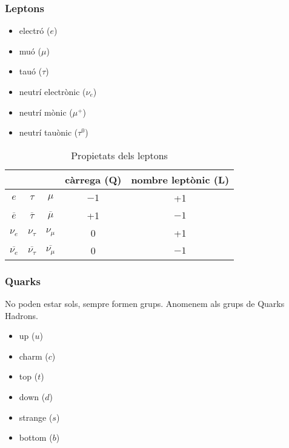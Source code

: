 \subsubsection{Leptons}
\label{ssub:leptons}

\begin{itemize}
    \item electró ($e$)
    \item muó ($\mu$)
    \item tauó ($\tau$)
    \item neutrí electrònic ($\nu_e$)
    \item neutrí mònic ($\mu^+$)
    \item neutrí tauònic ($\tau^0$)
\end{itemize}

\begin{table}[H]
    \centering
    \caption{Propietats dels leptons}
    \label{tab:propietats_dels_leptons}
    \begin{tabular}{ccccc}
        \toprule
        & & & càrrega (Q) & nombre leptònic (L) \\
        \midrule
        $e$ & $\tau$ & $\mu$ & $-1$ & +1 \\
        $\overline{e}$ & $\overline{\tau}$ & $\overline{\mu}$ & +1 & $-1$ \\
        $\nu_e$ & $\nu_\tau$ & $\nu_\mu$ & 0 & +1 \\
        $\overline{\nu_e}$ & $\overline{\nu_\tau}$ & $\overline{\nu_\mu}$ & 0 & $-1$ \\
        \bottomrule
    \end{tabular}
\end{table}

\subsubsection{Quarks}
\label{ssub:quarks}

No poden estar sols, sempre formen grups. Anomenem als grups de Quarks Hadrons.

\begin{itemize}
    \item up ($u$) 
    \item charm ($c$) 
    \item top ($t$) 
    \item down ($d$)
    \item strange ($s$)
    \item bottom ($b$)
\end{itemize}

